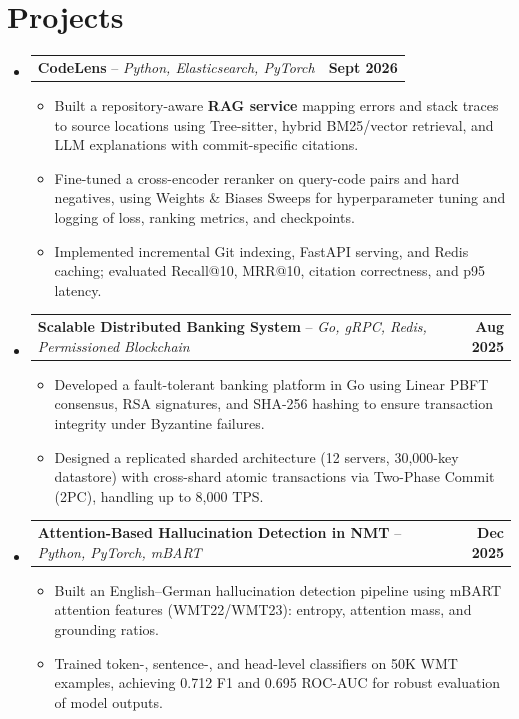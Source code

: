 \documentclass[letterpaper,11pt]{article}
\makeatletter
\newcommand{\resumeItem}[1]{
  \item\small{
    {#1 \vspace{-2pt}}
  }
}
\newcommand{\resumeProjectHeading}[2]{
    \item
    \begin{tabular*}{1.001\textwidth}{l@{\extracolsep{\fill}}r}
      \small#1 & \textbf{\small #2}\\
    \end{tabular*}\vspace{-7pt}
}
\newcommand{\resumeSubHeadingListStart}{\begin{itemize}[leftmargin=0.0in, label={}]}
\newcommand{\resumeSubHeadingListEnd}{\end{itemize}}
\newcommand{\resumeItemListStart}{\begin{itemize}}
\newcommand{\resumeItemListEnd}{\end{itemize}\vspace{-5pt}}
\makeatother
\begin{document}
\section{Projects}
    \vspace{-5pt}
    \resumeSubHeadingListStart

      \resumeProjectHeading
          {\textbf{CodeLens} -- \emph{Python, Elasticsearch, PyTorch}}{\textbf{Sept 2026}}
          \resumeItemListStart
            \resumeItem{Built a repository-aware \textbf{RAG service} mapping errors and stack traces to source locations using Tree-sitter, hybrid BM25/vector retrieval, and LLM explanations with commit-specific citations.}
            \resumeItem{Fine-tuned a cross-encoder reranker on query-code pairs and hard negatives, using Weights \& Biases Sweeps for hyperparameter tuning and logging of loss, ranking metrics, and checkpoints.}
            \resumeItem{Implemented incremental Git indexing, FastAPI serving, and Redis caching; evaluated Recall@10, MRR@10, citation correctness, and p95 latency.}
          \resumeItemListEnd
          \vspace{-13pt}

      \resumeProjectHeading
          {\textbf{Scalable Distributed Banking System} -- \emph{Go, gRPC, Redis, Permissioned Blockchain}}{\textbf{Aug 2025}}
          \resumeItemListStart
            \resumeItem{Developed a fault-tolerant banking platform in Go using Linear PBFT consensus, RSA signatures, and SHA-256 hashing to ensure transaction integrity under Byzantine failures.}
            \resumeItem{Designed a replicated sharded architecture (12 servers, 30,000-key datastore) with cross-shard atomic transactions via Two-Phase Commit (2PC), handling up to 8,000 TPS.}
          \resumeItemListEnd
          \vspace{-13pt}

      \resumeProjectHeading
          {\textbf{Attention-Based Hallucination Detection in NMT} -- \emph{Python, PyTorch, mBART}}{\textbf{Dec 2025}}
          \resumeItemListStart
            \resumeItem{Built an English--German hallucination detection pipeline using mBART attention features (WMT22/WMT23): entropy, attention mass, and grounding ratios.}
            \resumeItem{Trained token-, sentence-, and head-level classifiers on 50K WMT examples, achieving 0.712 F1 and 0.695 ROC-AUC for robust evaluation of model outputs.}
          \resumeItemListEnd
          \vspace{-13pt}

    \resumeSubHeadingListEnd
\end{document}
